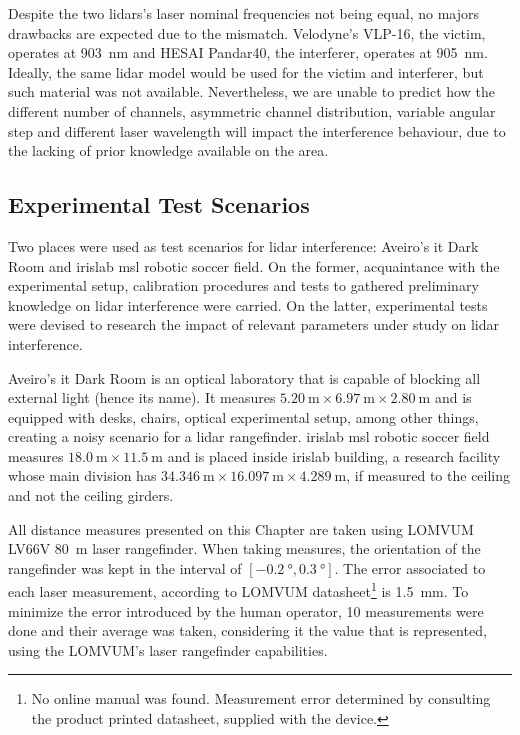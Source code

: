 Despite the two \acp{lidar}'s laser nominal frequencies not being equal, no majors drawbacks are expected due to the mismatch. Velodyne's VLP-16, the victim, operates at \SI{903}{\nano\meter} and HESAI Pandar40, the interferer, operates at \SI{905}{\nano\meter}. Ideally, the same \ac{lidar} model would be used for the victim and interferer, but such material was not available. Nevertheless, we are unable to predict how the different number of channels, asymmetric channel distribution, variable angular step and different laser wavelength will impact the interference behaviour, due to the lacking of prior knowledge available on the area.

\subsection{Experimental Test Scenarios}
\label{subsec:lidar-interference:test-scenarios}

Two places were used as test scenarios for \ac{lidar} interference: Aveiro's \ac{it} Dark Room and \ac{irislab} \ac{msl} robotic soccer field. On the former, acquaintance with the experimental setup, calibration procedures and tests to gathered preliminary knowledge on \ac{lidar} interference were carried. On the latter, experimental tests were devised to research the impact of relevant parameters under study on \ac{lidar} interference. 

Aveiro's \ac{it} Dark Room is an optical laboratory that is capable of blocking all external light (hence its name). It measures $\SI{5.20}{\meter} \times \SI{6.97}{\meter} \times \SI{2.80}{\meter}$ and is equipped with desks, chairs, optical experimental setup, among other things, creating a noisy scenario for a \ac{lidar} rangefinder. 
\ac{irislab} \ac{msl} robotic soccer field measures $\SI{18.0}{\meter} \times \SI{11.5}{\meter}$ and is placed inside \ac{irislab} building, a research facility whose main division has $\SI{34.346}{\meter} \times \SI{16.097}{\meter} \times \SI{4.289}{\meter}$, if measured to the ceiling and not the ceiling girders. 

All distance measures presented on this Chapter are taken using LOMVUM LV66V \SI{80}{\meter} laser rangefinder. When taking measures, the orientation of the rangefinder was kept in the interval of $[\SI{-0.2}{\degree}, \SI{0.3}{\degree}]$. The error associated to each laser measurement, according to LOMVUM datasheet\footnote{No online manual was found. Measurement error determined by consulting the product printed datasheet, supplied with the device.} is \SI{1.5}{\milli\meter}. To minimize the error introduced by the human operator, 10 measurements were done and their average was taken, considering it the value that is represented, using the LOMVUM's laser rangefinder capabilities.


